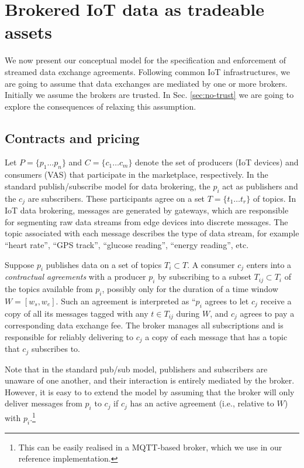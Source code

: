 \documentclass[chi_draft]{sigchi}
\begin{document}
\section{Brokered IoT data as tradeable assets}

We now present our conceptual model for the specification and enforcement of streamed data exchange agreements.
%
Following common IoT infrastructures, we are going to assume that data exchanges are mediated by one or more brokers.
Initially we assume the brokers are trusted. In Sec. \ref{sec:no-trust} we are going to explore the consequences of relaxing this assumption.

\subsection{Contracts and pricing}

Let  $P = \{p_1 \dots p_n \}$ and $C = \{ c_1 \dots c_m \}$ denote the set of producers (IoT devices) and consumers (VAS) that participate in the marketplace, respectively.
%
In the standard publish/subscribe model for data brokering, the $p_i$ act as publishers and the $c_j$ are subscribers.
These participants agree on a set $T = \{ t_1 \dots t_r \}$ of topics.
In IoT data brokering, messages are generated by gateways, which are responsible for segmenting raw data streams from edge devices into discrete messages.
The topic associated with each message describes the type of data stream, for example ``heart rate'', ``GPS track'', ``glucose reading'', ``energy reading'', etc.

Suppose $ p_i $ publishes data on a set of topics $T_{i} \subset T$.
A consumer $ c_j  $ enters into a \textit{contractual agreements} with a producer $ p_i  $ by subscribing to a subset $T_{ij} \subset T_i$ of the topics available from $p_i$, possibly only for the duration of a time window $ W = [w_s, w_e] $.
Such an agreement is interpreted as ``$p_i$ agrees to let $c_j$ receive a copy of all its messages tagged with any $t \in T_{ij}$ during $W$, and $c_j$ agrees to pay a corresponding data exchange fee. 
The broker manages all subscriptions and is responsible for reliably delivering to $ c_j  $ a copy of each message that has a topic that $ c_j $ subscribes to.

Note that in the standard pub/sub model, publishers and subscribers are unaware of one another, and their interaction is entirely mediated by the broker. 
However, it is easy to to extend the model by assuming that the broker will only deliver messages from $ p_i $ to $ c_j $ if $ c_j $ has an active agreement (i.e., relative to $W$) with $ p_i $.\footnote{This can be easily realised in a MQTT-based broker, which we use in our reference implementation.}
\end{document}
